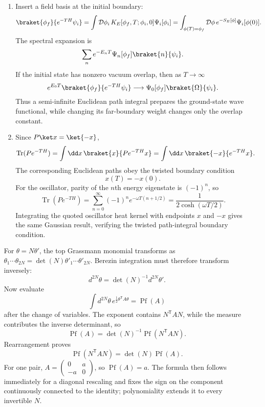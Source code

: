 \begin{enumerate}
\begin{enumerate}
\item
Insert a field basis at the initial boundary:
\[
 \braket{\phi_f}{e^{-TH}\psi_i}
 =\int\mathcal D\phi_i\,K_E[\phi_f,T;\phi_i,0]\Psi_i[\phi_i]
 =\int_{\phi(T)=\phi_f}\mathcal D\phi\,
 e^{-S_E[\phi]}\Psi_i[\phi(0)].
\]
The spectral expansion is
\[
 \sum_n e^{-E_nT}\Psi_n[\phi_f]
 \braket{n}{\psi_i}.
\]
If the initial state has nonzero vacuum overlap, then as \(T\to\infty\)
\[
 e^{E_0T}\braket{\phi_f}{e^{-TH}\psi_i}
 \longrightarrow
 \Psi_0[\phi_f]\braket{\Omega}{\psi_i}.
\]
Thus a semi-infinite Euclidean path integral prepares the ground-state wave
functional, while changing its far-boundary weight changes only the
overlap constant.
\item
Since \(P\ket x=\ket{-x}\),
\[
 \operatorname{Tr}(Pe^{-TH})
 =\int \dd x\,\braket{x}{Pe^{-TH}x}
 =\int \dd x\,\braket{-x}{e^{-TH}x}.
\]
The corresponding Euclidean paths obey the twisted boundary condition
\[
 x(T)=-x(0).
\]
For the oscillator, parity of the \(n\)th energy eigenstate is
\((-1)^n\), so
\[
 \operatorname{Tr}(Pe^{-TH})
 =\sum_{n=0}^{\infty}(-1)^n
 e^{-\omega T(n+1/2)}
 =\frac1{2\cosh(\omega T/2)}.
\]
Integrating the quoted oscillator heat kernel with endpoints \(x\) and
\(-x\) gives the same Gaussian result, verifying the twisted path-integral
boundary condition.
\end{enumerate}

For \(\theta=N\theta'\), the top Grassmann monomial transforms as
\(\theta_1\cdots\theta_{2N}=\det(N)\theta'_1\cdots\theta'_{2N}\).
Berezin integration must therefore transform inversely:
\[
 d^{2N}\theta=\det(N)^{-1}d^{2N}\theta'.
\]
Now evaluate
\[
 \int d^{2N}\theta\,
 e^{\frac12\theta^{\mathsf T}A\theta}
 =\operatorname{Pf}(A)
\]
after the change of variables.  The exponent contains
\(N^{\mathsf T}AN\), while the measure contributes the inverse determinant,
so
\[
 \operatorname{Pf}(A)
 =\det(N)^{-1}\operatorname{Pf}(N^{\mathsf T}AN).
\]
Rearrangement proves
\[
 \boxed{\operatorname{Pf}(N^{\mathsf T}AN)
 =\det(N)\operatorname{Pf}(A)}.
\]
For one pair,
\(A=\left(\begin{smallmatrix}0&a\\-a&0\end{smallmatrix}\right)\), so
\(\operatorname{Pf}(A)=a\).  The formula then follows immediately for a
diagonal rescaling and fixes the sign on the component continuously
connected to the identity; polynomiality extends it to every invertible
\(N\).


\end{enumerate}

